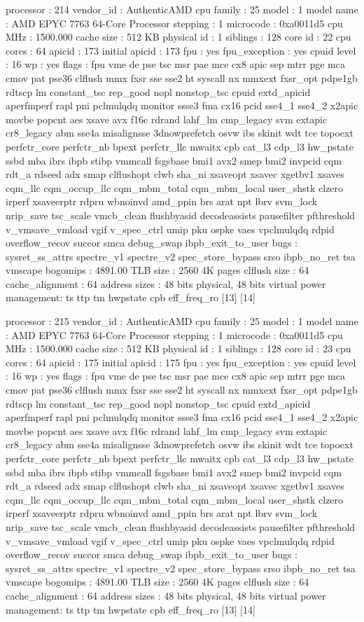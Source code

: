 processor	: 214
vendor_id	: AuthenticAMD
cpu family	: 25
model		: 1
model name	: AMD EPYC 7763 64-Core Processor
stepping	: 1
microcode	: 0xa0011d5
cpu MHz		: 1500.000
cache size	: 512 KB
physical id	: 1
siblings	: 128
core id		: 22
cpu cores	: 64
apicid		: 173
initial apicid	: 173
fpu		: yes
fpu_exception	: yes
cpuid level	: 16
wp		: yes
flags		: fpu vme de pse tsc msr pae mce cx8 apic sep mtrr pge mca cmov pat pse36 clflush mmx fxsr sse sse2 ht syscall nx mmxext fxsr_opt pdpe1gb rdtscp lm constant_tsc rep_good nopl nonstop_tsc cpuid extd_apicid aperfmperf rapl pni pclmulqdq monitor ssse3 fma cx16 pcid sse4_1 sse4_2 x2apic movbe popcnt aes xsave avx f16c rdrand lahf_lm cmp_legacy svm extapic cr8_legacy abm sse4a misalignsse 3dnowprefetch osvw ibs skinit wdt tce topoext perfctr_core perfctr_nb bpext perfctr_llc mwaitx cpb cat_l3 cdp_l3 hw_pstate ssbd mba ibrs ibpb stibp vmmcall fsgsbase bmi1 avx2 smep bmi2 invpcid cqm rdt_a rdseed adx smap clflushopt clwb sha_ni xsaveopt xsavec xgetbv1 xsaves cqm_llc cqm_occup_llc cqm_mbm_total cqm_mbm_local user_shstk clzero irperf xsaveerptr rdpru wbnoinvd amd_ppin brs arat npt lbrv svm_lock nrip_save tsc_scale vmcb_clean flushbyasid decodeassists pausefilter pfthreshold v_vmsave_vmload vgif v_spec_ctrl umip pku ospke vaes vpclmulqdq rdpid overflow_recov succor smca debug_swap ibpb_exit_to_user
bugs		: sysret_ss_attrs spectre_v1 spectre_v2 spec_store_bypass srso ibpb_no_ret tsa vmscape
bogomips	: 4891.00
TLB size	: 2560 4K pages
clflush size	: 64
cache_alignment	: 64
address sizes	: 48 bits physical, 48 bits virtual
power management: ts ttp tm hwpstate cpb eff_freq_ro [13] [14]

processor	: 215
vendor_id	: AuthenticAMD
cpu family	: 25
model		: 1
model name	: AMD EPYC 7763 64-Core Processor
stepping	: 1
microcode	: 0xa0011d5
cpu MHz		: 1500.000
cache size	: 512 KB
physical id	: 1
siblings	: 128
core id		: 23
cpu cores	: 64
apicid		: 175
initial apicid	: 175
fpu		: yes
fpu_exception	: yes
cpuid level	: 16
wp		: yes
flags		: fpu vme de pse tsc msr pae mce cx8 apic sep mtrr pge mca cmov pat pse36 clflush mmx fxsr sse sse2 ht syscall nx mmxext fxsr_opt pdpe1gb rdtscp lm constant_tsc rep_good nopl nonstop_tsc cpuid extd_apicid aperfmperf rapl pni pclmulqdq monitor ssse3 fma cx16 pcid sse4_1 sse4_2 x2apic movbe popcnt aes xsave avx f16c rdrand lahf_lm cmp_legacy svm extapic cr8_legacy abm sse4a misalignsse 3dnowprefetch osvw ibs skinit wdt tce topoext perfctr_core perfctr_nb bpext perfctr_llc mwaitx cpb cat_l3 cdp_l3 hw_pstate ssbd mba ibrs ibpb stibp vmmcall fsgsbase bmi1 avx2 smep bmi2 invpcid cqm rdt_a rdseed adx smap clflushopt clwb sha_ni xsaveopt xsavec xgetbv1 xsaves cqm_llc cqm_occup_llc cqm_mbm_total cqm_mbm_local user_shstk clzero irperf xsaveerptr rdpru wbnoinvd amd_ppin brs arat npt lbrv svm_lock nrip_save tsc_scale vmcb_clean flushbyasid decodeassists pausefilter pfthreshold v_vmsave_vmload vgif v_spec_ctrl umip pku ospke vaes vpclmulqdq rdpid overflow_recov succor smca debug_swap ibpb_exit_to_user
bugs		: sysret_ss_attrs spectre_v1 spectre_v2 spec_store_bypass srso ibpb_no_ret tsa vmscape
bogomips	: 4891.00
TLB size	: 2560 4K pages
clflush size	: 64
cache_alignment	: 64
address sizes	: 48 bits physical, 48 bits virtual
power management: ts ttp tm hwpstate cpb eff_freq_ro [13] [14]

